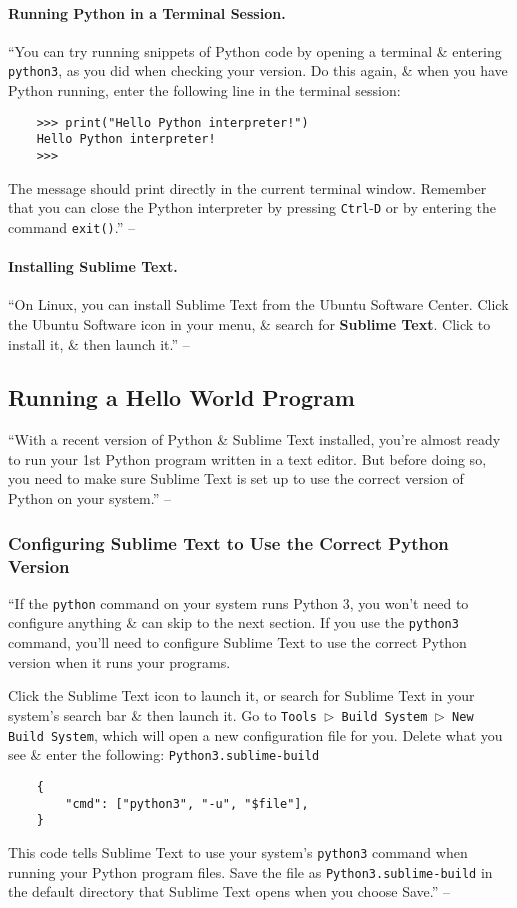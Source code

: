 \documentclass[oneside]{book}
\numberwithin{equation}{section}
\begin{document}
\paragraph{Running Python in a Terminal Session.} ``You can try running snippets of Python code by opening a terminal \& entering \texttt{python3}, as you did when checking your version. Do this again, \& when you have Python running, enter the following line in the terminal session:
\begin{verbatim}
	>>> print("Hello Python interpreter!")
	Hello Python interpreter!
	>>>
\end{verbatim}
The message should print directly in the current terminal window. Remember that you can close the Python interpreter by pressing \texttt{Ctrl}-\texttt{D} or by entering the command \texttt{exit()}.'' -- \cite[p. 9]{Matthes2019}

\paragraph{Installing Sublime Text.} ``On Linux, you can install Sublime Text from the Ubuntu Software Center. Click the Ubuntu Software icon in your menu, \& search for \textbf{Sublime Text}. Click to install it, \& then launch it.'' -- \cite[p. 9]{Matthes2019}

\subsection{Running a Hello World Program}
``With a recent version of Python \& Sublime Text installed, you're almost ready to run your 1st Python program written in a text editor. But before doing so, you need to make sure Sublime Text is set up to use the correct version of Python on your system.'' -- \cite[p. 9]{Matthes2019}

\subsubsection{Configuring Sublime Text to Use the Correct Python Version}
``If the \texttt{python} command on your system runs Python 3, you won't need to configure anything \& can skip to the next section. If you use the \texttt{python3} command, you'll need to configure Sublime Text to use the correct Python version when it runs your programs.

Click the Sublime Text icon to launch it, or search for Sublime Text in your system's search bar \& then launch it. Go to \texttt{Tools $\triangleright$ Build System $\triangleright$ New Build System}, which will open a new configuration file for you. Delete what you see \& enter the following: \texttt{Python3.sublime-build}
\begin{verbatim}
	{
	    "cmd": ["python3", "-u", "$file"],
	}
\end{verbatim}
This code tells Sublime Text to use your system's \texttt{python3} command when running your Python program files. Save the file as \texttt{Python3.sublime-build} in the default directory that Sublime Text opens when you choose Save.'' -- \cite[pp. 9--10]{Matthes2019}
\end{document}
